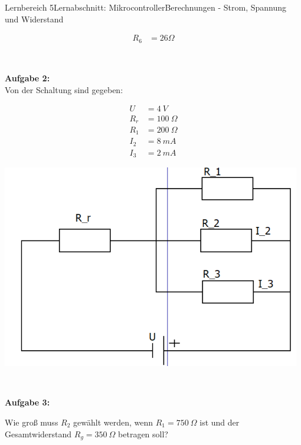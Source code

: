 \documentclass[oneside,openany,headings=optiontotoc,11pt,numbers=noenddot]{scrreprt}
\begin{document}
\begin{worksheet}{Lernbereich 5}{Lernabschnitt: Mikrocontroller}{Berechnungen - Strom, Spannung und Widerstand}
\begin{framed}
\begin{minipage}[c]{0.24\textwidth}
\begin{align*}
						R_6 & = 26 \Omega
					\end{align*}
				\end{minipage}\\
				\par\noindent
				\textbf{Aufgabe 2:}\\
				Von der Schaltung sind gegeben:\\
				\begin{minipage}{0.48\textwidth}
					\begin{align*}
						U & = 4\ V\\
						R_r & = 100\ \Omega\\
						R_1 & = 200\ \Omega\\
						I_2 & = 8\ mA\\
						I_3 & = 2\ mA
					\end{align*}
				\end{minipage}
				\hfill
				\begin{minipage}{0.5\textwidth}
					\includegraphics[width=0.98\textwidth]{../99_Bilder/A2.png}
				\end{minipage}\\
				\par\noindent
				\textbf{Aufgabe 3:}\\
				\begin{minipage}{0.58\textwidth}
					Wie groß muss \(R_2\) gewählt werden, wenn \(R_1 = 750\ \Omega\) ist und der Gesamtwiderstand \(R_g = 350\ \Omega\) betragen soll?
				\end{minipage}
				\hfill
				\begin{minipage}{0.38\textwidth}

\end{minipage}
\end{framed}
\end{worksheet}
\end{document}
